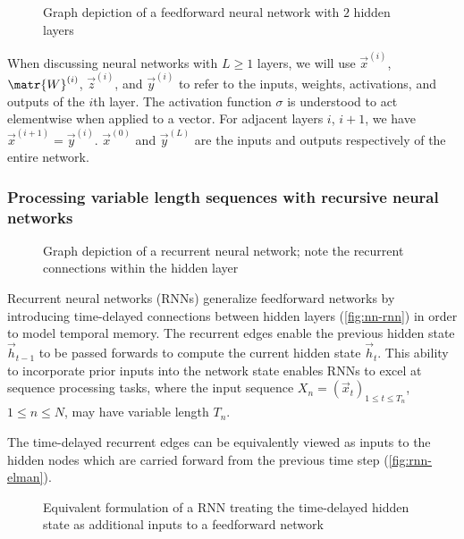 \begin{figure}[htpb]
    \centering
    
    \caption{Graph depiction of a feedforward neural network with $2$ hidden layers}
    \label{fig:nn-ffw}
\end{figure}

When discussing neural networks with $L \geq 1$ layers, we will use
$\vec{x}^{(i)}$, $\matr{W}^{(i)}$, $\vec{z}^{(i)}$, and $\vec{y}^{(i)}$ to
refer to the inputs, weights, activations, and outputs of the $i$th layer. The
activation function $\sigma$ is understood to act elementwise when applied to a
vector. For adjacent layers $i$, $i+1$, we have $\vec{x}^{(i+1)} =
\vec{y}^{(i)}$. $\vec{x}^{(0)}$ and $\vec{y}^{(L)}$ are the inputs and outputs
respectively of the entire network.

\subsubsection{Processing variable length sequences with recursive neural networks}

\begin{figure}[htpb]
    \centering
    
    \caption{Graph depiction of a recurrent neural network; note the recurrent connections
    within the hidden layer}
    \label{fig:nn-rnn}
\end{figure}

Recurrent neural networks (RNNs) generalize feedforward networks by introducing
time-delayed connections between hidden layers (\autoref{fig:nn-rnn}) in order
to model temporal memory. The recurrent edges enable the previous hidden state
$\vec{h}_{t-1}$ to be passed forwards to compute the current hidden state
$\vec{h}_t$. This ability to incorporate prior inputs into the network state
enables RNNs to excel at sequence processing tasks, where the input sequence
$X_n = (\vec{x}_t)_{1 \leq t \leq T_n}$, $1 \leq n \leq N$, may have variable
length $T_n$.

The time-delayed recurrent edges can be equivalently viewed as inputs to the
hidden nodes which are carried forward from the previous time step
(\autoref{fig:rnn-elman}).

\begin{figure}[htpb]
    \centering
    
    \caption{Equivalent formulation of a RNN treating the time-delayed hidden state
    as additional inputs to a feedforward network}
    \label{fig:rnn-elman}
\end{figure}

